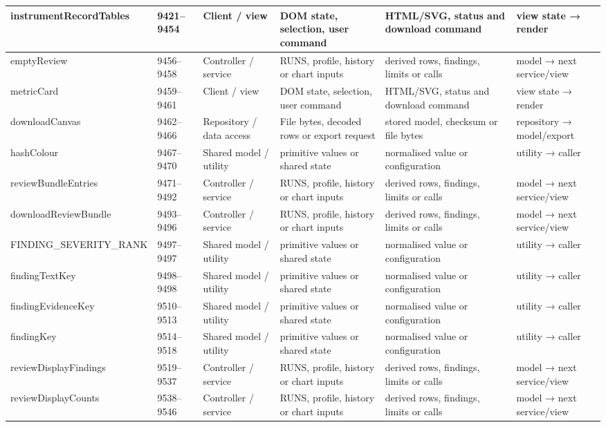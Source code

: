 \begin{landscape}
\begin{longtable}{@{}p{3.2cm}p{1.45cm}p{2.7cm}p{4.0cm}p{4.0cm}p{3.0cm}@{}}
instrumentRecordTables & 9421--9454 & Client / view & DOM state, selection, user command & HTML/SVG, status and download command & view state → render \\\hline
emptyReview & 9456--9458 & Controller / service & RUNS, profile, history or chart inputs & derived rows, findings, limits or calls & model → next service/view \\\hline
metricCard & 9459--9461 & Client / view & DOM state, selection, user command & HTML/SVG, status and download command & view state → render \\\hline
downloadCanvas & 9462--9466 & Repository / data access & File bytes, decoded rows or export request & stored model, checksum or file bytes & repository → model/export \\\hline
hashColour & 9467--9470 & Shared model / utility & primitive values or shared state & normalised value or configuration & utility → caller \\\hline
reviewBundleEntries & 9471--9492 & Controller / service & RUNS, profile, history or chart inputs & derived rows, findings, limits or calls & model → next service/view \\\hline
downloadReviewBundle & 9493--9496 & Controller / service & RUNS, profile, history or chart inputs & derived rows, findings, limits or calls & model → next service/view \\\hline
FINDING\_SEVERITY\_RANK & 9497--9497 & Shared model / utility & primitive values or shared state & normalised value or configuration & utility → caller \\\hline
findingTextKey & 9498--9498 & Shared model / utility & primitive values or shared state & normalised value or configuration & utility → caller \\\hline
findingEvidenceKey & 9510--9513 & Shared model / utility & primitive values or shared state & normalised value or configuration & utility → caller \\\hline
findingKey & 9514--9518 & Shared model / utility & primitive values or shared state & normalised value or configuration & utility → caller \\\hline
reviewDisplayFindings & 9519--9537 & Controller / service & RUNS, profile, history or chart inputs & derived rows, findings, limits or calls & model → next service/view \\\hline
reviewDisplayCounts & 9538--9546 & Controller / service & RUNS, profile, history or chart inputs & derived rows, findings, limits or calls & model → next service/view \\\hline

\end{longtable}
\end{landscape}
